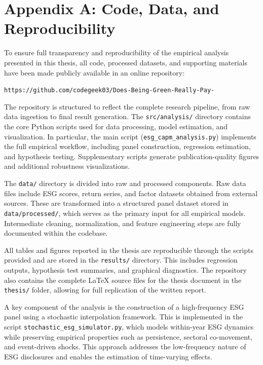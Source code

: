 \clearpage
\appendix
\section*{Appendix A: Code, Data, and Reproducibility}

To ensure full transparency and reproducibility of the empirical analysis presented in this thesis, all code, processed datasets, and supporting materials have been made publicly available in an online repository:

\begin{center}
\texttt{https://github.com/codegeek03/Does-Being-Green-Really-Pay-}
\end{center}

The repository is structured to reflect the complete research pipeline, from raw data ingestion to final result generation. The \texttt{src/analysis/} directory contains the core Python scripts used for data processing, model estimation, and visualization. In particular, the main script (\texttt{esg\_capm\_analysis.py}) implements the full empirical workflow, including panel construction, regression estimation, and hypothesis testing. Supplementary scripts generate publication-quality figures and additional robustness visualizations.

The \texttt{data/} directory is divided into raw and processed components. Raw data files include ESG scores, return series, and factor datasets obtained from external sources. These are transformed into a structured panel dataset stored in \texttt{data/processed/}, which serves as the primary input for all empirical models. Intermediate cleaning, normalization, and feature engineering steps are fully documented within the codebase.

All tables and figures reported in the thesis are reproducible through the scripts provided and are stored in the \texttt{results/} directory. This includes regression outputs, hypothesis test summaries, and graphical diagnostics. The repository also contains the complete \LaTeX{} source files for the thesis document in the \texttt{thesis/} folder, allowing for full replication of the written report.

A key component of the analysis is the construction of a high-frequency ESG panel using a stochastic interpolation framework. This is implemented in the script \texttt{stochastic\_esg\_simulator.py}, which models within-year ESG dynamics while preserving empirical properties such as persistence, sectoral co-movement, and event-driven shocks. This approach addresses the low-frequency nature of ESG disclosures and enables the estimation of time-varying effects.

